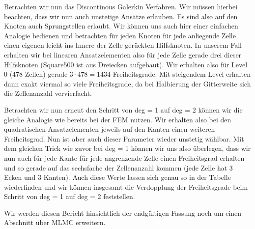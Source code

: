 \begin{figure}[H]
	\centering
\end{figure}

Betrachten wir nun das Discontinous Galerkin Verfahren. Wir müssen hierbei beachten, dass wir nun auch unstetige Ansätze erlauben. Es sind also auf den Knoten auch Sprungstellen erlaubt. Wir können uns auch hier einer einfachen Analogie bedienen und betrachten für jeden Knoten für jede anliegende Zelle einen eigenen leicht ins Innere der Zelle gerückten Hilfsknoten. In unserem Fall erhalten wir bei linearen Ansatzelementen also für jede Zelle gerade drei dieser Hilfsknoten (Square500 ist aus Dreiecken aufgebaut). Wir erhalten also für Level 0 (478 Zellen) gerade $3 \cdot 478 = 1434$ Freiheitsgrade. Mit steigendem Level erhalten dann exakt viermal so viele Freiheitsgrade, da bei Halbierung der Gitterweite sich die Zellenanzahl vervierfacht. 

Betrachten wir nun erneut den Schritt von deg = 1 auf deg = 2 können wir die gleiche Analogie wie bereits bei der FEM nutzen. Wir erhalten also bei den quadratischen Ansatzelementen jeweils auf den Kanten einen weiteren Freiheitsgrad. Nun ist aber auch dieser Parameter wieder unstetig wählbar. Mit dem gleichen Trick wie zuvor bei deg = 1 können wir uns also überlegen, dass wir nun auch für jede Kante für jede angrenzende Zelle einen Freiheitsgrad erhalten und so gerade auf das sechsfache der Zellenanzahl kommen (jede Zelle hat 3 Ecken und 3 Kanten).
Auch diese Werte lassen sich genau so in der Tabelle wiederfinden und wir können insgesamt die Verdopplung der Freiheitsgrade beim Schritt von deg = 1 auf deg = 2 feststellen.

\remark Wir werden diesen Bericht hinsichtlich der endgültigen Fassung noch um einen Abschnitt über MLMC erweitern.




